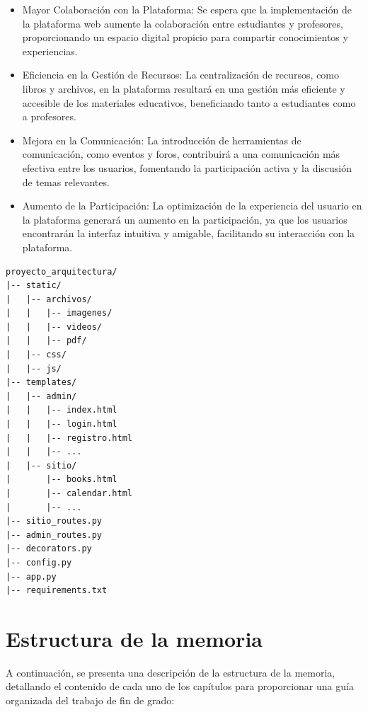 \documentclass[a4paper, 12pt]{book}
\begin{document}
\begin{itemize}
  \item Mayor Colaboración con la Plataforma: Se espera que la implementación de la plataforma web aumente la colaboración entre estudiantes y profesores, proporcionando un espacio digital propicio para compartir conocimientos y experiencias.
  \item Eficiencia en la Gestión de Recursos: La centralización de recursos, como libros y archivos, en la plataforma resultará en una gestión más eficiente y accesible de los materiales educativos, beneficiando tanto a estudiantes como a profesores.
  \item Mejora en la Comunicación: La introducción de herramientas de comunicación, como eventos y foros, contribuirá a una comunicación más efectiva entre los usuarios, fomentando la participación activa y la discusión de temas relevantes.
  \item Aumento de la Participación: La optimización de la experiencia del usuario en la plataforma generará un aumento en la participación, ya que los usuarios encontrarán la interfaz intuitiva y amigable, facilitando su interacción con la plataforma.
\end{itemize}

{\footnotesize
\begin{center}
\begin{verbatim}
proyecto_arquitectura/
|-- static/
|   |-- archivos/
|   |   |-- imagenes/
|   |   |-- videos/
|   |   |-- pdf/
|   |-- css/
|   |-- js/
|-- templates/
|   |-- admin/
|   |   |-- index.html
|   |   |-- login.html
|   |   |-- registro.html
|   |   |-- ...
|   |-- sitio/
|       |-- books.html
|       |-- calendar.html
|       |-- ...
|-- sitio_routes.py
|-- admin_routes.py
|-- decorators.py
|-- config.py
|-- app.py
|-- requirements.txt
\end{verbatim}
\end{center}
}

\section{Estructura de la memoria}
\label{sec:seccion}

A continuación, se presenta una descripción de la estructura de la memoria, 
detallando el contenido de cada uno de los capítulos para proporcionar 
una guía organizada del trabajo de fin de grado:
\end{document}
